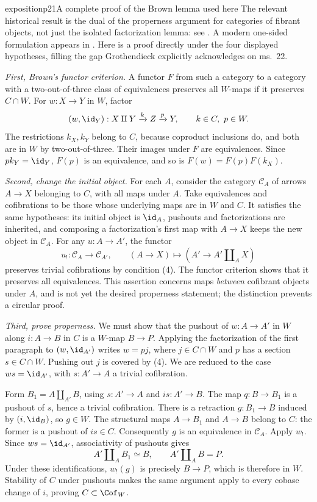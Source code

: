 \begin{dcomment}{exposition}{p21}{A complete proof of the Brown lemma used here}
The relevant historical result is the dual of the properness argument for categories of fibrant objects, not just the isolated factorization lemma: see \citet[Part I, \S1, pp.~420--422, and \S4, Lemmas 1--2, pp.~428--429]{Brown1973}. A modern one-sided formulation appears in \citet[\S\S1.3--1.4]{RadulescuBanu2009}. Here is a proof directly under the four displayed hypotheses, filling the gap Grothendieck explicitly acknowledges on ms.~22.

\emph{First, Brown's functor criterion.} A functor $F$ from such a category to a category with a two-out-of-three class of equivalences preserves all $W$-maps if it preserves $C\cap W$. For $w:X\to Y$ in $W$, factor
\[
(w,\id_Y):X\amalg Y\xrightarrow{k} Z\xrightarrow{p}Y,
\qquad k\in C,\ p\in W.
\]
The restrictions $k_X,k_Y$ belong to $C$, because coproduct inclusions do, and both are in $W$ by two-out-of-three. Their images under $F$ are equivalences. Since $pk_Y=\id_Y$, $F(p)$ is an equivalence, and so is $F(w)=F(p)F(k_X)$.

\emph{Second, change the initial object.} For each $A$, consider the category $\mathcal C_A$ of arrows $A\to X$ belonging to $C$, with all maps under $A$. Take equivalences and cofibrations to be those whose underlying maps are in $W$ and $C$. It satisfies the same hypotheses: its initial object is $\id_A$, pushouts and factorizations are inherited, and composing a factorization's first map with $A\to X$ keeps the new object in $\mathcal C_A$. For any $u:A\to A'$, the functor
\[
u_!: \mathcal C_A\longrightarrow\mathcal C_{A'},
\qquad (A\to X)\longmapsto(A'\to A'\amalg_A X)
\]
preserves trivial cofibrations by condition (4). The functor criterion shows that it preserves all equivalences. This assertion concerns maps \emph{between} cofibrant objects under $A$, and is not yet the desired properness statement; the distinction prevents a circular proof.

\emph{Third, prove properness.} We must show that the pushout of $w:A\to A'$ in $W$ along $i:A\to B$ in $C$ is a $W$-map $B\to P$. Applying the factorization of the first paragraph to $(w,\id_{A'})$ writes $w=pj$, where $j\in C\cap W$ and $p$ has a section $s\in C\cap W$. Pushing out $j$ is covered by (4). We are reduced to the case $ws=\id_{A'}$, with $s:A'\to A$ a trivial cofibration.

Form $B_1=A\amalg_{A'}B$, using $s:A'\to A$ and $is:A'\to B$. The map $q:B\to B_1$ is a pushout of $s$, hence a trivial cofibration. There is a retraction $g:B_1\to B$ induced by $(i,\id_B)$, so $g\in W$. The structural maps $A\to B_1$ and $A\to B$ belong to $C$: the former is a pushout of $is\in C$. Consequently $g$ is an equivalence in $\mathcal C_A$. Apply $w_!$. Since $ws=\id_{A'}$, associativity of pushouts gives
\[
A'\amalg_A B_1\simeq B,
\qquad A'\amalg_A B=P.
\]
Under these identifications, $w_!(g)$ is precisely $B\to P$, which is therefore in $W$. Stability of $C$ under pushouts makes the same argument apply to every cobase change of $i$, proving $C\subset\Cof_W$.


\end{dcomment}
